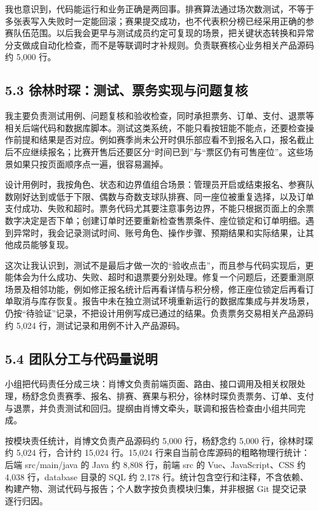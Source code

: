 \documentclass[UTF8,zihao=-4,a4paper]{ctexart}
\begin{document}
我也意识到，代码能运行和业务正确是两回事。排赛算法通过场次数测试，不等于多张表写入失败时一定能回滚；赛果提交成功，也不代表积分榜已经采用正确的参赛队伍范围。以后我会更早与测试成员约定可复现的场景，把关键状态转换和异常分支做成自动化检查，而不是等联调时才补规则。负责联赛核心业务相关产品源码约 5,000 行。


\subsection*{5.3 徐林时琛：测试、票务实现与问题复核}

我主要负责测试用例、问题复核和验收检查，同时承担票务、订单、支付、退票等相关后端代码和数据库脚本。测试这类系统，不能只看按钮能不能点，还要检查操作前提和结果是否对应。例如赛季尚未公开时俱乐部应看不到报名入口，报名截止后不应继续报名；比赛开售后还要区分“时间已到”与“票区仍有可售座位”。这些场景如果只按页面顺序点一遍，很容易漏掉。


设计用例时，我按角色、状态和边界值组合场景：管理员开启或结束报名、参赛队数刚好达到或低于下限、偶数与奇数支球队排赛、同一座位被重复选择，以及订单支付成功、失败和超时。票务代码尤其要注意事务边界，不能只根据页面上的余票数字决定是否下单；创建订单时还要重新检查售票条件、座位锁定和订单明细。遇到异常时，我会记录测试时间、账号角色、操作步骤、预期结果和实际结果，让其他成员能够复现。


这次让我认识到，测试不是最后才做一次的“验收点击”，而且参与代码实现后，更能体会为什么成功、失败、超时和退票要分别处理。修复一个问题后，还要重测原场景及相邻功能，例如修正报名统计后再看详情与积分榜，修正座位锁定后再看订单取消与库存恢复。报告中未在独立测试环境重新运行的数据库集成与并发场景，仍按“待验证”记录，不把设计用例写成已通过的结果。负责票务交易相关产品源码约 5,024 行，测试记录和用例不计入产品源码。


\subsection*{5.4 团队分工与代码量说明}

小组把代码责任分成三块：肖博文负责前端页面、路由、接口调用及相关权限处理，杨舒念负责赛季、报名、排赛、赛果与积分，徐林时琛负责票务、订单、支付与退票，并负责测试和回归。提纲由肖博文牵头，联调和报告检查由小组共同完成。


按模块责任统计，肖博文负责产品源码约 5,000 行，杨舒念约 5,000 行，徐林时琛约 5,024 行，合计约 15,024 行。15,024 行来自当前仓库源码的粗略物理行统计：后端 src/main/java 的 Java 约 8,808 行，前端 src 的 Vue、JavaScript、CSS 约 4,038 行，database 目录的 SQL 约 2,178 行。统计包含空行和注释，不含依赖、构建产物、测试代码与报告；个人数字按负责模块归集，并非根据 Git 提交记录逐行归因。
\end{document}
